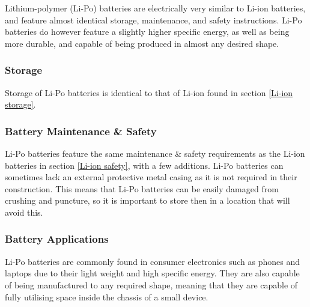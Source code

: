 \documentclass[a4paper,11pt]{article}
\begin{document}
\begin{multicols}{2}
Lithium-polymer (Li-Po) batteries are electrically very similar to Li-ion batteries, and feature almost identical storage, maintenance, and safety instructions. Li-Po batteries do however feature a slightly higher specific energy, as well as being more durable, and capable of being produced in almost any desired shape.

\subsubsection{Storage}

Storage of Li-Po batteries is identical to that of Li-ion found in section \ref{Li-ion storage}.

\subsubsection{Battery Maintenance \& Safety}

Li-Po batteries feature the same maintenance \& safety requirements as the Li-ion batteries in section \ref{Li-ion safety}, with a few additions. Li-Po batteries can sometimes lack an external protective metal casing as it is not required in their construction. This means that Li-Po batteries can be easily damaged from crushing and puncture, so it is important to store then in a location that will avoid this.

\subsubsection{Battery Applications}

Li-Po batteries are commonly found in consumer electronics such as phones and laptops due to their light weight and high specific energy. They are also capable of being manufactured to any required shape, meaning that they are capable of fully utilising space inside the chassis of a small device. 

\end{multicols}

\newpage
\onecolumn


\end{document}
